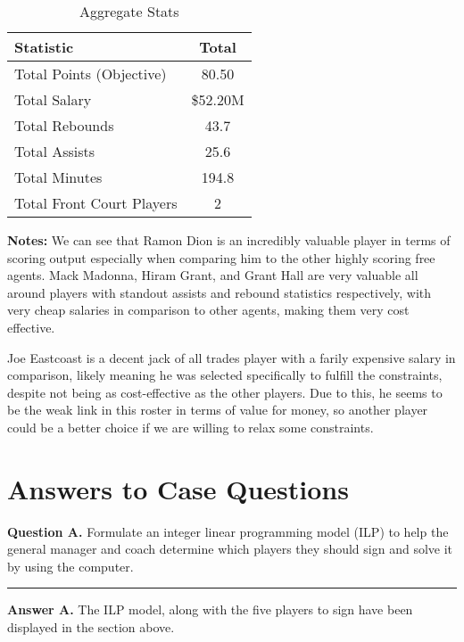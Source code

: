 \documentclass[a4paper,11pt]{article}
\newcommand{\vsp}{\vspace{0.5em}}
\newcommand{\ruler}{
    \vspace{1em}
    \hrule
    \vspace{1em}
}
\begin{document}
\begin{table}[h!]
    \centering
    \renewcommand{\arraystretch}{1.2} %
    \begin{tabular}{lc}
        \hline
        \textbf{Statistic}          & \textbf{Total} \\
        \hline
        Total Points (Objective)    & 80.50          \\
        Total Salary                & \$52.20M         \\
        Total Rebounds              & 43.7           \\
        Total Assists               & 25.6           \\
        Total Minutes               & 194.8          \\
        Total Front Court Players   & 2              \\
        \hline
    \end{tabular}
    \caption{Aggregate Stats}
    \label{tab:team_totals}
\end{table}

\textbf{Notes:} We can see that Ramon Dion is an incredibly valuable player in terms of scoring output especially when comparing him to the other highly scoring free agents. Mack Madonna, Hiram Grant, and Grant Hall are very valuable all around players with standout assists and rebound statistics respectively, with very cheap salaries in comparison to other agents, making them very cost effective. 

\vsp

Joe Eastcoast is a decent jack of all trades player with a farily expensive salary in comparison, likely meaning he was selected specifically to fulfill the constraints, despite not being as cost-effective as the other players. Due to this, he seems to be the weak link in this roster in terms of value for money, so another player could be a better choice if we are willing to relax some constraints.

\section{Answers to Case Questions}

\textbf{Question A.} 
Formulate an integer linear programming model (ILP) to help the general manager and coach determine which players they should sign and solve it by using the computer.

\ruler

\textbf{Answer A.} The ILP model, along with the five players to sign have been displayed in the section above.
\end{document}
